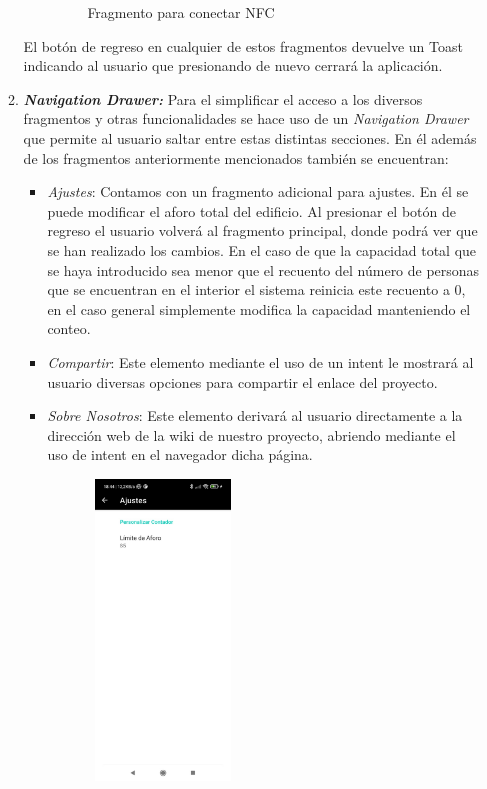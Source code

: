 \documentclass[a4paper,openright,12pt]{article}
\begin{document}
\begin{itemize}
\begin{enumerate}
\begin{itemize}
\begin{figure}[H]
     \caption{Fragmento para conectar NFC}
    \label{fig:my_label}
\end{figure}
\end{itemize}
El botón de regreso en cualquier de estos fragmentos devuelve un Toast indicando al usuario que presionando de nuevo cerrará la aplicación.
\item\textbf{\textit{Navigation Drawer:}} Para el simplificar el acceso a los diversos fragmentos y otras funcionalidades se hace uso de un \textit{Navigation Drawer} que permite al usuario saltar entre estas distintas secciones. En él además de los fragmentos anteriormente mencionados también se encuentran:
\begin{itemize}
    \item {\textit{Ajustes}: Contamos con un fragmento adicional para ajustes. En él se puede modificar el aforo total del edificio. Al presionar el botón de regreso el usuario volverá al fragmento principal, donde podrá ver que se han realizado los cambios. En el caso de que la capacidad total que se haya introducido sea menor que el recuento del número de personas que se encuentran en el interior el sistema reinicia este recuento a 0, en el caso general simplemente modifica la capacidad manteniendo el conteo.}
     \item {\textit{Compartir}: Este elemento mediante el uso de un intent le mostrará al usuario diversas opciones para compartir el enlace del proyecto.}
     \item {\textit{Sobre Nosotros}: Este elemento derivará al usuario directamente a la dirección web de la wiki de nuestro proyecto, abriendo mediante el uso de intent en el navegador dicha página.}
         \begin{figure}[H]
     \centering
    \includegraphics[width=4cm, height= 8cm]{ajustes.jpeg}

\end{figure}
\end{itemize}
\end{enumerate}
\end{itemize}
\end{document}
